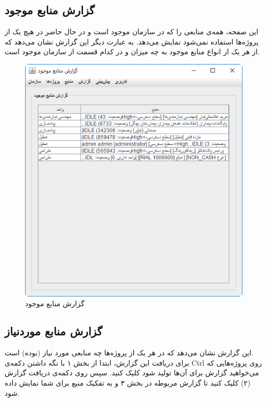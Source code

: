 \subsection{گزارش منابع موجود}
 این صفحه، همه‌ی منابعی را که در سازمان موجود است و در حال حاضر در هیچ یک از پروژه‌ها استفاده نمی‌شود نمایش می‌دهد. به عبارت دیگر این گزارش نشان می‌دهد که از هر یک از انواع منابع موجود به چه میزان و در کدام قسمت از سازمان موجود است.
	\begin{figure}[H]
		\centering
		\includegraphics[scale=0.6]{img/manual/availRep}
		\caption{گزارش منابع موجود}
	\end{figure}


\subsection{گزارش منابع موردنیاز}
این گزارش نشان می‌دهد که در هر یک از پروژه‌ها چه منابعی مورد نیاز  (بوده) است.\\
برای دریافت این گزارش، ابتدا از بخش ۱ با نگه داشتن دکمه‌ی Ctrl روی پروژه‌هایی که می‌خواهید گزارش برای آن‌ها تولید شود کلیک کنید. سپس روی دکمه‌ی دریافت گزارش (۲) کلیک کنید تا گزارش مربوطه در بخش ۳ و به تفکیک منبع برای شما نمایش داده شود.


